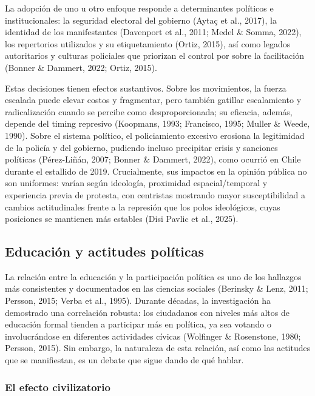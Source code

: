 \documentclass[
  13pt,
]{article}
\begin{document}
La adopción de uno u otro enfoque responde a determinantes políticos e
institucionales: la seguridad electoral del gobierno (Aytaç et al.,
2017), la identidad de los manifestantes (Davenport et al., 2011; Medel
\& Somma, 2022), los repertorios utilizados y su etiquetamiento (Ortiz,
2015), así como legados autoritarios y culturas policiales que priorizan
el control por sobre la facilitación (Bonner \& Dammert, 2022; Ortiz,
2015).

Estas decisiones tienen efectos sustantivos. Sobre los movimientos, la
fuerza escalada puede elevar costos y fragmentar, pero también gatillar
escalamiento y radicalización cuando se percibe como desproporcionada;
su eficacia, además, depende del timing represivo (Koopmans, 1993;
Francisco, 1995; Muller \& Weede, 1990). Sobre el sistema político, el
policiamiento excesivo erosiona la legitimidad de la policía y del
gobierno, pudiendo incluso precipitar crisis y sanciones políticas
(Pérez-Liñán, 2007; Bonner \& Dammert, 2022), como ocurrió en Chile
durante el estallido de 2019. Crucialmente, sus impactos en la opinión
pública no son uniformes: varían según ideología, proximidad
espacial/temporal y experiencia previa de protesta, con centristas
mostrando mayor susceptibilidad a cambios actitudinales frente a la
represión que los polos ideológicos, cuyas posiciones se mantienen más
estables (Disi Pavlic et al., 2025).

\subsection{Educación y actitudes
políticas}\label{educaciuxf3n-y-actitudes-poluxedticas}

La relación entre la educación y la participación política es uno de los
hallazgos más consistentes y documentados en las ciencias sociales
(Berinsky \& Lenz, 2011; Persson, 2015; Verba et al., 1995). Durante
décadas, la investigación ha demostrado una correlación robusta: los
ciudadanos con niveles más altos de educación formal tienden a
participar más en política, ya sea votando o involucrándose en
diferentes actividades cívicas (Wolfinger \& Rosenstone, 1980; Persson,
2015). Sin embargo, la naturaleza de esta relación, así como las
actitudes que se manifiestan, es un debate que sigue dando de qué
hablar.

\subsubsection{El efecto civilizatorio}\label{el-efecto-civilizatorio}
\end{document}
